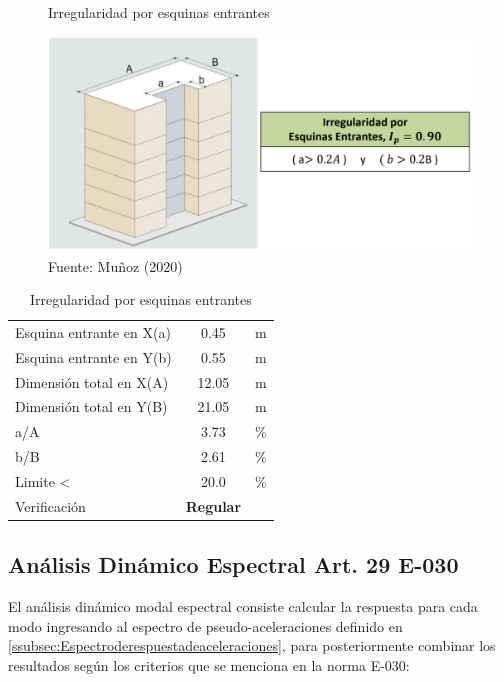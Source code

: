 \documentclass{article}%
\begin{document}
\begin{figure}[H]%
\centering%
\caption{Irregularidad por esquinas entrantes}%
\includegraphics[scale=0.5]{images/i_esquinas.PNG}%
\caption*{\small Fuente: Muñoz (2020)}%
\end{figure}

%


\begin{table}[H]%
\centering%
\caption{Irregularidad por esquinas entrantes}%
\begin{tabular}{llcr}%
\cline{1-3}%
\multicolumn{2}{l}{Esquina entrante en X(a)} & 0.45 & \multicolumn{1}{l}{m} \\%
\multicolumn{2}{l}{Esquina entrante en Y(b)} & 0.55 & \multicolumn{1}{l}{m} \\%
\multicolumn{2}{l}{Dimensión total en X(A)} & 12.05 & \multicolumn{1}{l}{m} \\%
\multicolumn{2}{l}{Dimensión total en Y(B)} & 21.05 & \multicolumn{1}{l}{m} \\%
\multicolumn{2}{l}{a/A} & 3.73 & \multicolumn{1}{l}{\%} \\%
\multicolumn{2}{l}{b/B} & 2.61 & \multicolumn{1}{l}{\%} \\%
\multicolumn{2}{l}{Limite <} & 20.0 & \multicolumn{1}{l}{\%} \\%
\multicolumn{2}{l}{Verificación} & \textcolor[rgb]{ .267,  .447,  .769}{\textbf{Regular}} & \multicolumn{1}{l}{} \\%
\cline{1-3}%
\end{tabular}%
\end{table}

%
\subsection{Análisis Dinámico Espectral Art. 29 E{-}030}%
\label{subsec:AnlisisDinmicoEspectralArt.29E{-}030}%
El análisis dinámico modal espectral consiste calcular la respuesta para cada modo ingresando al espectro de pseudo-aceleraciones definido en \ref{ssubsec:Espectroderespuestadeaceleraciones}, para posteriormente combinar los resultados según los criterios que se menciona en la norma E-030:%
\end{document}
